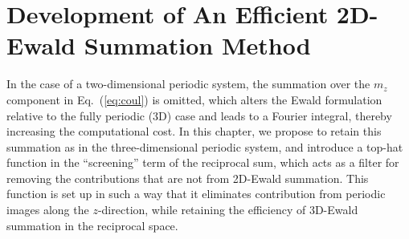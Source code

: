 
\chapter{Development of An Efficient 2D-Ewald Summation Method}

\label{Chapter4}

In the case of a two-dimensional periodic system, the summation over the $m_z$ component in Eq.~(\ref{eq:coul}) is omitted, which alters the Ewald formulation relative to the fully periodic (3D) case and leads to a Fourier integral, thereby increasing the computational cost. In this chapter, we propose to retain this summation as in the three-dimensional periodic system, and introduce a top-hat function in the ``screening'' term of the reciprocal sum, which acts as a filter for removing the contributions that are not from 2D-Ewald summation. This function is set up in such a way that it eliminates contribution from periodic images along the $z$-direction, while retaining the efficiency of 3D-Ewald summation in the reciprocal space. 

 
